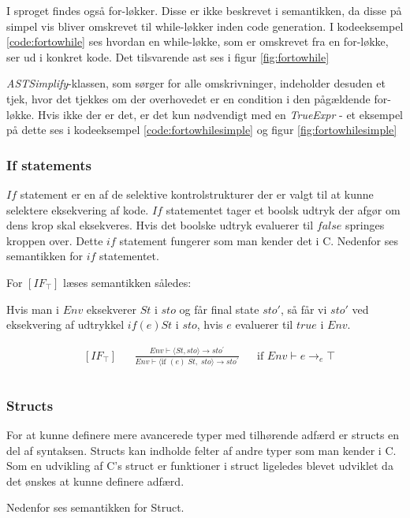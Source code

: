 \noindent I sproget findes også for-løkker. Disse er ikke beskrevet i semantikken, da disse på simpel vis bliver omskrevet til while-løkker inden code generation. I kodeeksempel \ref{code:fortowhile} ses hvordan en while-løkke, som er omskrevet fra en for-løkke, ser ud i konkret kode. Det tilsvarende \gls{ast} ses i figur \ref{fig:fortowhile}



\noindent \textit{ASTSimplify}-klassen, som sørger for alle omskrivninger, indeholder desuden et tjek, hvor det tjekkes om der overhovedet er en condition i den pågældende for-løkke. Hvis ikke der er det, er det kun nødvendigt med en \textit{TrueExpr} - et eksempel på dette ses i kodeeksempel \ref{code:fortowhilesimple} og figur \ref{fig:fortowhilesimple}



\subsubsection*{If statements}
$If$ statement er en af de selektive kontrolstrukturer der er valgt til at kunne selektere eksekvering af kode. $If$ statementet tager et boolsk udtryk der afgør om dens krop skal eksekveres. Hvis det boolske udtryk evaluerer til $false$ springes kroppen over. Dette $if$ statement fungerer som man kender det i C. Nedenfor ses semantikken for $if$ statementet.

\noindent For $[IF_\top]$ læses semantikken således: 

Hvis man i $Env$ eksekverer $St$ i $sto$ og får final state $sto'$, så får vi $sto'$ ved eksekvering af udtrykkel $if(e)  St$ i $sto$, hvis $e$ evaluerer til $true$ i $Env$.

\begin{align*}
&[IF_\top] & &\frac{Env \vdash \langle St, sto \rangle \rightarrow sto^\prime}{Env \vdash \langle \text{if } (e)\; St,\; sto \rangle \rightarrow sto^\prime} & &\text{if } Env \vdash e \rightarrow_e \top\\\\
\end{align*}

\subsubsection*{Structs}
For at kunne definere mere avancerede typer med tilhørende adfærd er structs en del af syntaksen. Structs kan indholde felter af andre typer som man kender i C. Som en udvikling af C's struct er funktioner i struct ligeledes blevet udviklet da det ønskes at kunne definere adfærd.

Nedenfor ses semantikken for Struct.

